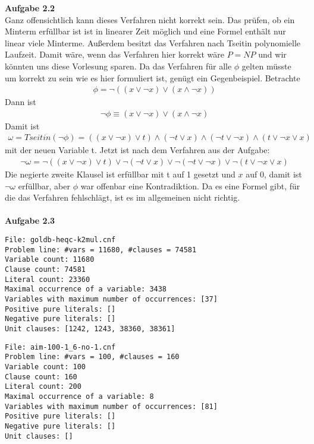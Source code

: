 \documentclass[a4paper,10pt]{article}
\begin{document}
\noindent\textbf{Aufgabe 2.2}\\
Ganz offensichtlich kann dieses Verfahren nicht korrekt sein. Das prüfen, ob ein Minterm erfüllbar ist ist in linearer Zeit möglich und eine Formel enthält nur linear viele Minterme. Außerdem besitzt das Verfahren nach Tseitin polynomielle Laufzeit. Damit wäre, wenn das Verfahren hier korrekt wäre $P = NP$ und wir könnten uns diese Vorlesung sparen. Da das Verfahren für alle $\phi$ gelten müsste um korrekt zu sein wie es hier formuliert ist, genügt ein Gegenbeispiel. Betrachte
\begin{align*}
\phi = \neg ((x \vee \neg x) \vee (x \wedge \neg x))
\end{align*} 
Dann ist 
\begin{align*}
\neg \phi \equiv (x \vee \neg x) \vee (x \wedge \neg x)
\end{align*}
Damit ist 
\begin{align*}
\omega = Tseitin(\neg \phi) = ((x \vee \neg x) \vee t) \wedge (\neg t \vee x) \wedge (\neg t \vee \neg x) \wedge (t \vee \neg x \vee x)
\end{align*}
mit der neuen Variable t. Jetzt ist nach dem Verfahren aus der Aufgabe:
\begin{align*}
\neg \omega = \neg((x \vee \neg x) \vee t) \vee \neg(\neg t \vee x) \vee \neg(\neg t \vee \neg x) \vee \neg(t \vee \neg x \vee x)
\end{align*}
Die negierte zweite Klausel ist erfüllbar mit t auf 1 gesetzt und $x$ auf 0, damit ist $\neg \omega$ erfüllbar, aber $\phi$ war offenbar eine Kontradiktion. Da es eine Formel gibt, für die das Verfahren fehlschlägt, ist es im allgemeinen nicht richtig.\\\\
\noindent\textbf{Aufgabe 2.3}
\begin{lstlisting}
File: goldb-heqc-k2mul.cnf
Problem line: #vars = 11680, #clauses = 74581
Variable count: 11680
Clause count: 74581
Literal count: 23360
Maximal occurrence of a variable: 3438
Variables with maximum number of occurrences: [37]
Positive pure literals: []
Negative pure literals: []
Unit clauses: [1242, 1243, 38360, 38361]
\end{lstlisting}
\begin{lstlisting}
File: aim-100-1_6-no-1.cnf
Problem line: #vars = 100, #clauses = 160
Variable count: 100
Clause count: 160
Literal count: 200
Maximal occurrence of a variable: 8
Variables with maximum number of occurrences: [81]
Positive pure literals: []
Negative pure literals: []
Unit clauses: []
\end{lstlisting}
\end{document}
